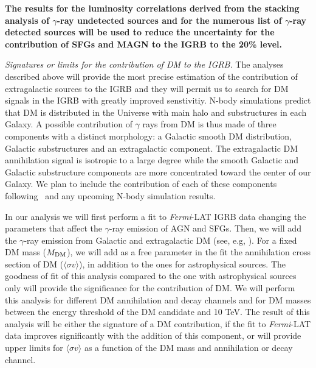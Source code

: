 \documentclass[12 pt]{article}
\begin{document}
{\bf The results for the luminosity correlations derived from the stacking analysis of $\gamma$-ray undetected sources and for the numerous list of $\gamma$-ray detected sources will be used to reduce the uncertainty for the contribution of SFGs and MAGN to the IGRB to the 20\% level.}



{\it Signatures or limits for the contribution of DM to the IGRB.}
The analyses described above will provide the most precise estimation of the contribution of extragalactic sources to the IGRB and they will permit us to search for DM signals in the IGRB with greatly improved senstivitiy. 
N-body simulations predict that DM is distributed in the Universe with main halo and substructures in each Galaxy.
A possible contribution of $\gamma$ rays from DM is thus made of three components with a distinct morphology: a Galactic smooth DM distribution, Galactic substructures and an extragalactic component.
The extragalactic DM annihilation signal is isotropic to a large degree while the smooth Galactic and Galactic substructure components are more concentrated toward the center of our Galaxy.
We plan to include the contribution of each of these components following~\cite{Cirelli:2010xx,Ajello:2015mfa} and any upcoming N-body simulation results.

In our analysis we will first perform a fit to {\it Fermi}-LAT IGRB data changing the parameters that affect the $\gamma$-ray emission of AGN and SFGs. 
Then, we will add the $\gamma$-ray emission from Galactic and extragalactic DM (see, e.g, \cite{DiMauro:2015tfa,Ajello:2015mfa}). For a fixed DM mass ($M_{\rm{DM}}$), we will add as a free parameter in the fit the annihilation cross section of DM ($\langle \sigma v \rangle$), in addition to the ones for astrophysical sources.
The goodness of fit of this analysis compared to the one with astrophysical sources only will provide the significance for the contribution of DM.
We will perform this analysis for different DM annihilation and decay channels and for DM masses between the energy threshold of the DM candidate and 10 TeV.
The result of this analysis will be either the signature of a DM contribution, if the fit to {\it Fermi}-LAT data improves significantly with the addition of this component, or will provide upper limits for $\langle \sigma v \rangle$ as a function of the DM mass and annihilation or decay channel.
\end{document}
